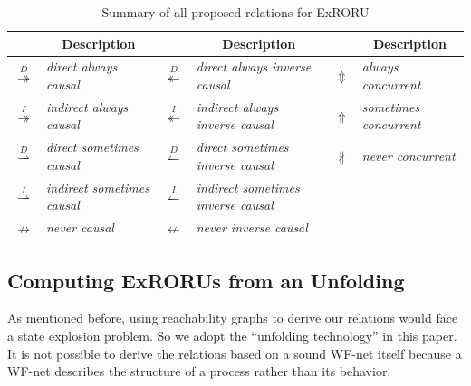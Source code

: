 \documentclass{llncs}
\begin{document}
\begin{table}[htbp]
\centering
\caption{Summary of all proposed relations for ExRORU\label{tab:relations}}
	\begin{tabular}{|c|l||c|l||c|l|} \hline
		& \multicolumn{1}{|c||}{\multirow{1}{*}{Description}} & & \multicolumn{1}{|c||}{\multirow{1}{*}{Description}} & & \multicolumn{1}{|c|}{\multirow{1}{*}{Description}}\\ \hline
		$\overset{D}{\twoheadrightarrow}$ & \textit{direct always causal} & $\overset{D}{\twoheadleftarrow}$ & \textit{direct always inverse causal} & $\Updownarrow$ & \textit{always concurrent}\\
		$\overset{I}{\twoheadrightarrow}$ & \textit{indirect always causal} & $\overset{I}{\twoheadleftarrow}$ & \textit{indirect always inverse causal} & $\Uparrow$ & \textit{sometimes concurrent}\\
		$\overset{D}{\rightharpoonup}$ & \textit{direct sometimes causal} & $\overset{D}{\leftharpoonup}$ & \textit{direct sometimes inverse causal} & $\nparallel$ & \textit{never concurrent}\\
		$\overset{I}{\rightharpoonup}$ & \textit{indirect sometimes causal} & $\overset{I}{\leftharpoonup}$ & \textit{indirect sometimes inverse causal} & & \\
		$\nrightarrow$ & \textit{never causal} & $\nleftarrow$ & \textit{never inverse causal} & & \\
		\hline
	\end{tabular}
\end{table}

\subsection{Computing ExRORUs from an Unfolding}\label{subsec:computationOfRelations}
As mentioned before, using reachability graphs to derive our relations would face a state explosion problem. %
So we adopt the ``unfolding technology'' in this paper. It is not possible to derive the relations based on a sound WF-net itself because a WF-net describes the structure of a process rather than its behavior.
\end{document}
